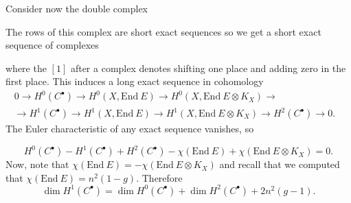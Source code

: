 \documentclass[12pt,a4paper]{book}
\theoremstyle{definition} \newtheorem{defn}[thm]{Definition}
\theoremstyle{definition} \newtheorem{ejemplo}[thm]{Example}
\theoremstyle{remark} \newtheorem{rem}[thm]{Remark}
\def\pr{\mathrm{pr}}
\def\End{\mathrm{End}}
\def\delbar{\bar{\partial}}
\newcommand{\ve}[1]{\mathbf{#1}}
\begin{document}
	      Consider now the double complex
	      \begin{center}
	      \end{center}
	      The rows of this complex are short exact sequences so we get a short exact sequence of complexes
	      \begin{center}
	      \end{center}
	      where the $[1]$ after a complex denotes shifting one place and adding zero in the first place. This induces a long exact sequence in cohomology
	      \begin{align*}
		  0 \rightarrow  H^0(C^\bullet) \rightarrow  H^0(X,\End\ E) \rightarrow H^0(X,\End\ E \otimes K_X) \rightarrow &		  \\ 
		  \rightarrow H^1(C^\bullet) \rightarrow H^1(X, \End\ E) \rightarrow H^1(X, \End\ E \otimes K_X) \rightarrow H^2(C^\bullet) \rightarrow 0.
	      \end{align*}
	      The Euler characteristic of any exact sequence vanishes, so

	      \begin{equation*}
		H^0(C^\bullet) - H^1(C^\bullet) + H^2(C^\bullet) - \chi(\End\ E) + \chi(\End\ E \otimes K_X)=0.
	      \end{equation*}
	      Now, note that $\chi(\End\ E)= -\chi(\End\ E \otimes K_X)$ and recall that we computed that $\chi(\End\ E)= n^2(1-g)$. 
	      Therefore
	      \begin{equation*}
		\dim H^1(C^\bullet)= \dim H^0(C^\bullet) + \dim H^2(C^\bullet) + 2n^2(g-1).
	      \end{equation*}
\end{document}
